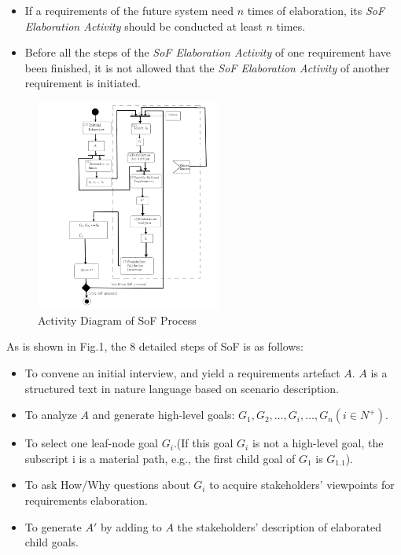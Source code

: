 ﻿\documentclass{beamer}
\begin{document}
\begin{frame}{}        %
  \begin{itemize}
  \item If a requirements of the future system need $n$ times of elaboration, its \emph{SoF Elaboration Activity} should be conducted at least $n$ times.\pause
  \item Before all the steps of the \emph{SoF Elaboration Activity} of one requirement have been finished, it is not allowed that the \emph{SoF Elaboration Activity} of another requirement is initiated. \pause
  \end{itemize}
\end{frame}

\begin{frame}          %
  \begin{figure}
    \includegraphics[width=2.4in]{img/2.PNG}
    \caption{Activity Diagram of SoF Process}
  \end{figure}
\end{frame}

\begin{frame}    {As is shown in Fig.1, the 8 detailed steps of SoF is as follows:}        %
  \small{
  \begin{itemize}
  \item %
    To convene an initial interview, and yield a requirements artefact  $A$. $A$ is a structured text in nature language based on scenario description.\pause
  \item %
    To analyze $A$ and generate high-level goals: $G_1, G_2, \ldots, G_i, \ldots, G_n (i\in N^+)$. \pause
  \item %
    To select one leaf-node goal $G_i$.(If this goal $G_i$ is not a high-level goal, the subscript i is a material path, e.g., the first child goal of $G_1$ is $G_{1.1}$). \pause
  \item %
    To ask How/Why questions about $G_i$ to acquire stakeholders' viewpoints for requirements elaboration.\pause
  \item %
    To generate $A'$ by adding to $A$ the stakeholders' description of elaborated child goals.\pause
  \end{itemize}
  }
\end{frame}
\end{document}
